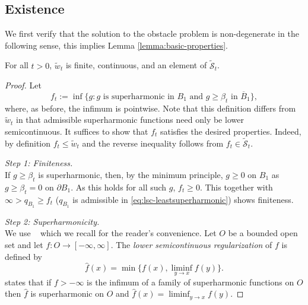 \documentclass[12pt]{amsart}
\numberwithin{equation}{section}
\newcommand{\mclSshift}[2]{\hyperref[eq:shifted-supersolutions]{\mathcal{\tilde{S}}^{#1}_{#2}}}
\newcommand{\lssshift}[2]{\hyperref[eq:appendix-least-supersolution]{\tilde{w}^{#1}_{#2}}}
\begin{document}
	
	
	
	
	\subsection{Existence} 
	
	We first verify that the solution to the obstacle problem is non-degenerate in the following sense, this implies
	Lemma \ref{lemma:basic-properties}. 
	\begin{lemma}\label{lemma:appendix-basic-properties}
		For all $t > 0$, $\lssshift{}{t}$ is finite, continuous, and an element of $\mclSshift{}{t}$. 
	\end{lemma}
	\begin{proof}
		Let 
		\begin{equation} \label{eq:lsc-leastsuperharmonic}
		f_t  := \inf \{ g: g \mbox{ is superharmonic in $B_1$ and $g \geq \beta_t$ in $\overline{B}_1$} \},
		\end{equation}
		where, as before, the infimum is pointwise. 
		Note that this definition differs from $\lssshift{}{t}$ in that admissible superharmonic functions need only be lower semicontinuous. 
		It suffices to show that $f_t$ satisfies the desired properties. Indeed, by definition $f_t \leq  \lssshift{}{t}$
		and the reverse inequality follows from $f_t \in \mclSshift{}{t}$.
		
		{\it Step 1: Finiteness.} \\
		If $g \geq \beta_t$ is superharmonic, then, by the minimum principle, $g \geq 0$ on $B_1$ as $g \geq \beta_t = 0$ on $\partial B_1$. 
		As this holds for all such $g$, $f_t \geq 0$. This together with $\infty > q_{B_1} \geq f_t$ ($q_{B_1}$ is admissible in \eqref{eq:lsc-leastsuperharmonic}) shows finiteness.
		
		{\it Step 2: Superharmonicity.} \\
		We use ~\cite[Theorem 3.7.5]{armitage2000classical}
		which we recall for the reader's convenience. Let $O$ be a bounded open set and let $f:O \to [-\infty, \infty]$.
		The {\it lower semicontinuous regularization} of $f$ is defined by 
		\begin{equation} \label{eq:lower-semicontinuous}
		\hat{f}(x) = \min \{ f(x), \liminf_{y \to x} f(y) \}.
		\end{equation}
		\cite[Theorem 3.7.5]{armitage2000classical} states that if $f > -\infty$ is the infimum of a family of superharmonic functions on $O$
		then $\hat{f}$ is superharmonic on $O$ and $\hat{f}(x) = \liminf_{y \to x} f(y)$. 
		

\end{proof}
\end{document}

